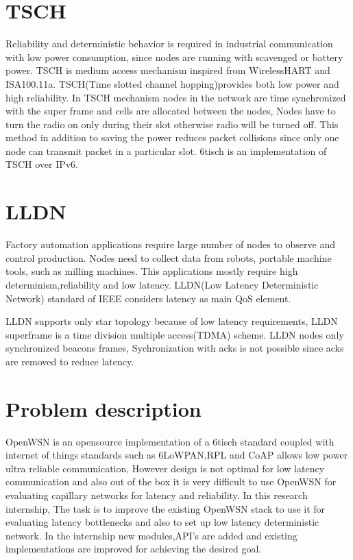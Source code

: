 \section{TSCH}
Reliability and deterministic behavior is required in industrial communication with low power consumption, since nodes are running with scavenged or battery power. TSCH is medium access mechanism inspired from WirelessHART and ISA100.11a. 
TSCH(Time slotted channel hopping)provides both low power and high reliability. In TSCH mechanism nodes in the network are time synchronized with the super frame and cells are allocated between the nodes, Nodes have to turn the radio on only during their slot otherwise radio will be turned off. This method in addition to saving the power reduces packet collisions since only one node can transmit packet in a particular slot. 6tisch is an implementation of TSCH over IPv6.

\section{LLDN}
Factory automation applications require large number of nodes to observe and control production. Nodes need to collect data from robots, portable machine tools, such as milling machines. This applications mostly require high determinism,reliability and low latency. LLDN(Low Latency Deterministic Network) standard of IEEE considers latency as main QoS element.

LLDN supports only star topology because of low latency requirements, LLDN superframe is a time division multiple access(TDMA) scheme. LLDN nodes only synchronized beacons frames, Sychronization with acks is not possible since acks are removed to reduce latency.

\section{Problem description}
OpenWSN is an opensource implementation of a 6tisch standard coupled with internet of things standards such as 6LoWPAN,RPL and CoAP allows low power ultra reliable communication, However design is not optimal for low latency communication and also out of the box it is very difficult to use OpenWSN for evaluating capillary networks for latency and reliability. In this research internship, The task is to improve the existing OpenWSN stack to use it for evaluating latency bottlenecks and also to set up low latency deterministic network. In the internship new modules,API's are added and existing implementations are improved for achieving the desired goal.


